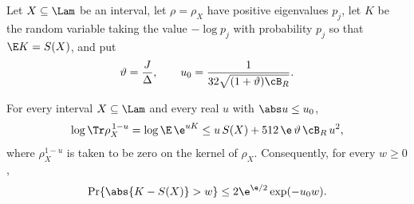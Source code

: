 \precisely
Let $X\subseteq\Lam$ be an interval, let $\rho=\rho_X$ have positive
eigenvalues $p_j$, let $K$ be the random variable taking the value
$-\log p_j$ with probability $p_j$ so that $\E K=S(X)$, and put
\begin{equation}\label{eq:theta}
 \vartheta=\frac J\Delta,\qquad
 u_0=\frac{1}{32\sqrt{(1+\vartheta)\cB_R}}.
\end{equation}

\begin{lemma}\label{lem:tail}
For every interval $X\subseteq\Lam$ and every real $u$ with $\abs u\le u_0$,
\begin{equation}\label{eq:mgf}
 \log\Tr\rho_X^{\,1-u}=\log\E\,\e^{uK}\le u\,S(X)+512\,\e\,\vartheta\,\cB_R\,u^2 ,
\end{equation}
where $\rho_X^{1-u}$ is taken to be zero on the kernel of $\rho_X$.
Consequently, for every $w\ge0$,
\begin{equation}\label{eq:tail}
 \Pr\{\abs{K-S(X)}>w\}\le 2\e^{\e/2}\exp(-u_0w).
\end{equation}
\end{lemma}

